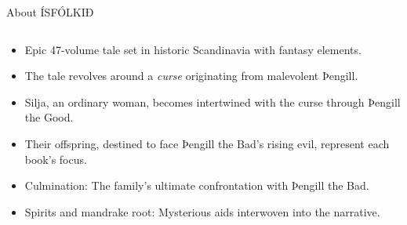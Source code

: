 \begin{frame}{About ÍSFÓLKIÐ}

    \begin{columns}[T]
        \begin{column}{0.65\textwidth}
            \begin{itemize}
                \item Epic 47-volume tale set in historic Scandinavia with fantasy elements.
                \item The tale revolves around a \emph{curse} originating from malevolent Þengill.
                \item Silja, an ordinary woman, becomes intertwined with the curse through Þengill the Good.
                \item Their offspring, destined to face Þengill the Bad's rising evil, represent each book's focus.
                \item Culmination: The family's ultimate confrontation with Þengill the Bad.
                \item Spirits and mandrake root: Mysterious aids interwoven into the narrative.
            \end{itemize}
        \end{column}


\end{columns}
\end{frame}
